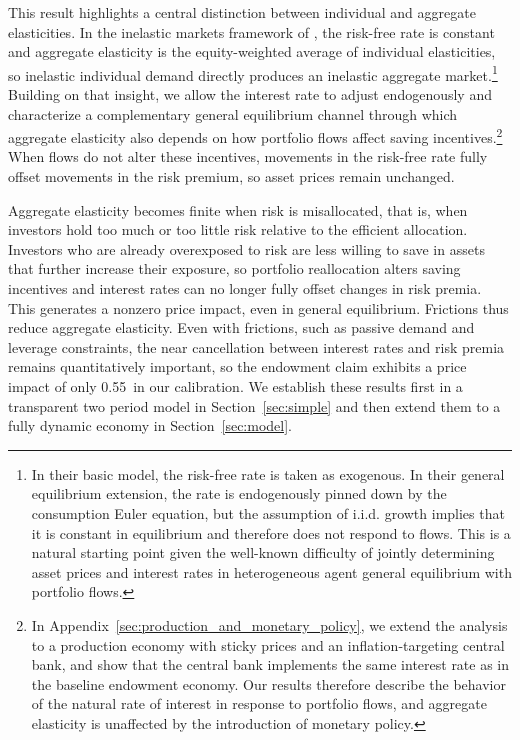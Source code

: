 \documentclass[12pt,english]{article}
\newcommand{\PIYhat}{0.55}        %
\begin{document}
This result highlights a central distinction between individual and aggregate elasticities.
In the inelastic markets framework of \citet{gabaix2020search}, the risk-free rate is constant and aggregate elasticity is the equity-weighted average of individual elasticities, so inelastic individual demand directly produces an inelastic aggregate market.\footnote{In their basic model, the risk-free rate is taken as exogenous. In their general equilibrium extension, the rate is endogenously pinned down by the consumption Euler equation, but the assumption of i.i.d. growth implies that it is constant in equilibrium and therefore does not respond to flows. This is a natural starting point given the well-known difficulty of jointly determining asset prices and interest rates in heterogeneous agent general equilibrium with portfolio flows.}
Building on that insight, we allow the interest rate to adjust endogenously and characterize a complementary general equilibrium channel through which aggregate elasticity also depends on how portfolio flows affect saving incentives.\footnote{In Appendix~\ref{sec:production_and_monetary_policy}, we extend the analysis to a production economy with sticky prices and an inflation-targeting central bank, and show that the central bank implements the same interest rate as in the baseline endowment economy. Our results therefore describe the behavior of the natural rate of interest in response to portfolio flows, and aggregate elasticity is unaffected by the introduction of monetary policy.}
When flows do not alter these incentives, movements in the risk-free rate fully offset movements in the risk premium, so asset prices remain unchanged.

Aggregate elasticity becomes finite when risk is misallocated, that is, when investors hold too much or too little risk relative to the efficient allocation.
Investors who are already overexposed to risk are less willing to save in assets that further increase their exposure, so portfolio reallocation alters saving incentives and interest rates can no longer fully offset changes in risk premia.
This generates a nonzero price impact, even in general equilibrium.
Frictions thus reduce aggregate elasticity.
Even with frictions, such as passive demand and leverage constraints, the near cancellation between interest rates and risk premia remains quantitatively important, so the endowment claim exhibits a price impact of only \PIYhat\ in our calibration.
We establish these results first in a transparent two period model in Section~\ref{sec:simple} and then extend them to a fully dynamic economy in Section~\ref{sec:model}.
\end{document}
